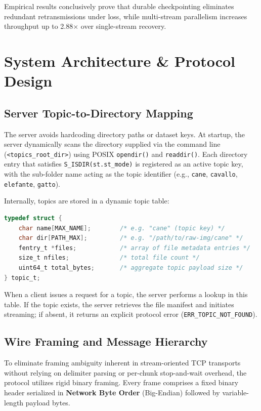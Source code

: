 \documentclass[11pt,a4paper]{article}
\begin{document}
Empirical results conclusively prove that durable checkpointing eliminates redundant retransmissions under loss, while multi-stream parallelism increases throughput up to 2.88$\times$ over single-stream recovery.

\section{System Architecture \& Protocol Design}

\subsection{Server Topic-to-Directory Mapping}
The server avoids hardcoding directory paths or dataset keys. At startup, the server dynamically scans the directory supplied via the command line (\texttt{<topics\_root\_dir>}) using POSIX \texttt{opendir()} and \texttt{readdir()}. Each directory entry that satisfies \texttt{S\_ISDIR(st.st\_mode)} is registered as an active topic key, with the sub-folder name acting as the topic identifier (e.g., \texttt{cane}, \texttt{cavallo}, \texttt{elefante}, \texttt{gatto}).

Internally, topics are stored in a dynamic topic table:
\begin{lstlisting}[language=C]
typedef struct {
    char name[MAX_NAME];        /* e.g. "cane" (topic key) */
    char dir[PATH_MAX];         /* e.g. "/path/to/raw-img/cane" */
    fentry_t *files;            /* array of file metadata entries */
    size_t nfiles;              /* total file count */
    uint64_t total_bytes;       /* aggregate topic payload size */
} topic_t;
\end{lstlisting}
When a client issues a request for a topic, the server performs a lookup in this table. If the topic exists, the server retrieves the file manifest and initiates streaming; if absent, it returns an explicit protocol error (\texttt{ERR\_TOPIC\_NOT\_FOUND}).

\subsection{Wire Framing and Message Hierarchy}
To eliminate framing ambiguity inherent in stream-oriented TCP transports without relying on delimiter parsing or per-chunk stop-and-wait overhead, the protocol utilizes rigid binary framing. Every frame comprises a fixed binary header serialized in \textbf{Network Byte Order} (Big-Endian) followed by variable-length payload bytes.
\end{document}
